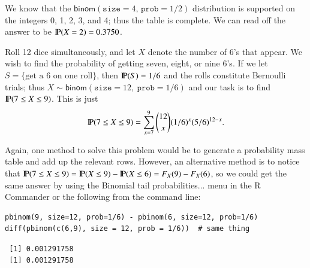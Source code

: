 \documentclass[captions=tableheading]{scrbook}
\begin{document}
We know that the \(\mathsf{binom}(\mathtt{size}=4,\,\mathtt{prob}=1/2)\) distribution is supported on the integers 0, 1, 2, 3, and 4; thus the table is complete. We can read off the answer to be \(\P(X=2)=0.3750\).


\begin{example}
Roll 12 dice simultaneously, and let \(X\) denote the number of 6's that appear. We wish to find the probability of getting seven, eight, or nine 6's. If we let \(S=\{ \mbox{get a 6 on one roll} \} \), then \(\P(S)=1/6\) and the rolls constitute Bernoulli trials; thus \(X\sim\mathsf{binom}(\mathtt{size}=12,\ \mathtt{prob}=1/6)\) and our task is to find \(\P(7\leq X\leq9)\). This is just
\[ 
\P(7\leq X\leq9)=\sum_{x=7}^{9}{12 \choose x}(1/6)^{x}(5/6)^{12-x}.
\]

Again, one method to solve this problem would be to generate a probability mass table and add up the relevant rows. However, an alternative method is to notice that \(\P(7\leq X\leq9)=\P(X\leq9)-\P(X\leq6)=F_{X}(9)-F_{X}(6)\), so we could get the same answer by using the \textsf{Binomial tail probabilities}... menu in the \textsf{R} Commander or the following from the command line: 


\begin{verbatim}
pbinom(9, size=12, prob=1/6) - pbinom(6, size=12, prob=1/6)
diff(pbinom(c(6,9), size = 12, prob = 1/6))  # same thing
\end{verbatim}

\begin{verbatim}
 [1] 0.001291758
 [1] 0.001291758
\end{verbatim}

\end{example}
\end{document}
